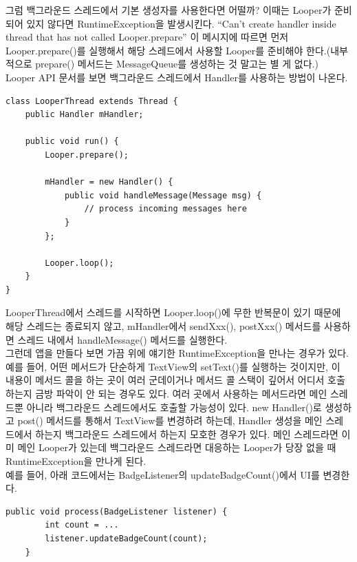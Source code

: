 그럼 백그라운드 스레드에서 기본 생성자를 사용한다면 어떨까? 이때는 Looper가 준비되어 있지 않다면 RuntimeException을 발생시킨다. 
``Can't create handler inside thread that has not called Looper.prepare''
이 메시지에 따르면 먼저 Looper.prepare()를 실행해서 해당 스레드에서 사용할 Looper를 준비해야 한다.(내부적으로 prepare() 메서드는 MessageQueue를 생성하는 것 말고는 별 게 없다.)\\

Looper API 문서를 보면 백그라운드 스레드에서 Handler를 사용하는 방법이 나온다.

\begin{lstlisting}[frame=single, caption=LooperThead, label=src:LooperThread] 
class LooperThread extends Thread {
	public Handler mHandler;

	public void run() {
		Looper.prepare();

		mHandler = new Handler() {
        	public void handleMessage(Message msg) {
            	// process incoming messages here
			}
		};

		Looper.loop();
	}
}
\end{lstlisting}
LooperThread에서 스레드를 시작하면 Looper.loop()에 무한 반복문이 있기 때문에 해당 스레드는 종료되지 않고, mHandler에서 sendXxx(), postXxx() 메서드를 사용하면 스레드 내에서 handleMessage() 메서드를 실행한다.\\

그런데 앱을 만들다 보면 가끔 위에 얘기한 RuntimeException을 만나는 경우가 있다.
예를 들어, 어떤 메서드가 단순하게 TextView의 setText()를 실행하는 것이지만, 이 내용이 메서드 콜을 하는 곳이 여러 군데이거나 메서드 콜 스택이 깊어서 어디서 호출하는지 금방 파악이 안 되는 경우도 있다.
여러 곳에서 사용하는 메서드라면 메인 스레드뿐 아니라 백그라운드 스레드에서도 호출할 가능성이 있다. 
new Handler()로 생성하고 post() 메서드를 통해서 TextView를 변경하려 하는데, Handler 생성을 메인 스레드에서 하는지 백그라운드 스레드에서 하는지 모호한 경우가 있다.
메인 스레드라면 이미 메인 Looper가 있는데 백그라운드 스레드라면 대응하는 Looper가 당장 없을 때 RuntimeException을 만나게 된다.\\

예를 들어, 아래 코드에서는 BadgeListener의 updateBadgeCount()에서 UI를 변경한다.
\begin{lstlisting}[frame=single] 
	public void process(BadgeListener listener) {
		int count = ...
		listener.updateBadgeCount(count);
	}
\end{lstlisting}	

